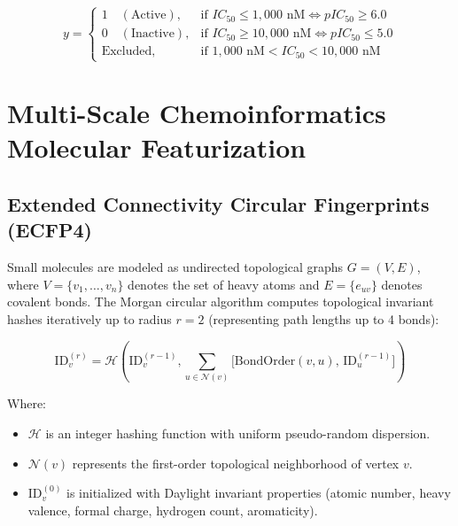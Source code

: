 \documentclass[11pt,a4paper]{article}
\begin{document}
\begin{equation}
\label{eq:discretization}
y = 
\begin{cases}
1 \quad (\text{Active}), & \text{if } IC_{50} \le 1{,}000\text{ nM} \iff pIC_{50} \ge 6.0 \\
0 \quad (\text{Inactive}), & \text{if } IC_{50} \ge 10{,}000\text{ nM} \iff pIC_{50} \le 5.0 \\
\text{Excluded}, & \text{if } 1{,}000\text{ nM} < IC_{50} < 10{,}000\text{ nM}
\end{cases}
\end{equation}

\section{Multi-Scale Chemoinformatics Molecular Featurization}

\subsection{Extended Connectivity Circular Fingerprints (ECFP4)}
Small molecules are modeled as undirected topological graphs $G = (V, E)$, where $V = \{v_1, \dots, v_n\}$ denotes the set of heavy atoms and $E = \{e_{uv}\}$ denotes covalent bonds. The Morgan circular algorithm computes topological invariant hashes iteratively up to radius $r = 2$ (representing path lengths up to 4 bonds):

\begin{equation}
\label{eq:morgan_hash}
\text{ID}_v^{(r)} = \mathcal{H}\left( \text{ID}_v^{(r-1)}, \sum_{u \in \mathcal{N}(v)} \Big[ \text{BondOrder}(v, u), \, \text{ID}_u^{(r-1)} \Big] \right)
\end{equation}

\noindent Where:
\begin{itemize}
    \item $\mathcal{H}$ is an integer hashing function with uniform pseudo-random dispersion.
    \item $\mathcal{N}(v)$ represents the first-order topological neighborhood of vertex $v$.
    \item $\text{ID}_v^{(0)}$ is initialized with Daylight invariant properties (atomic number, heavy valence, formal charge, hydrogen count, aromaticity).
\end{itemize}
\end{document}
